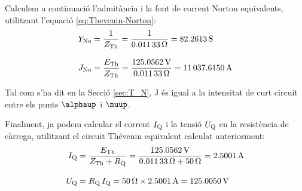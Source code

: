 \begin{exemple}
Calculem a continuaci\'{o} l'admit\`{a}ncia i la font de corrent  Norton equivalents, utilitzant
l'equaci\'{o} \eqref{eq:Thevenin-Norton}:
\begin{align*}
    Y_\mathrm{No} &= \frac{1}{Z_\mathrm{Th}} = \frac{1}{\SI{0,01133}{\ensuremath{\mathrm{\Omega}}}} = \SI{82,2613}{S}
    \\[2ex]
    J_\mathrm{No} &= \frac{E_\mathrm{Th}}{Z_\mathrm{Th}} =
    \frac{\SI{125,0562}{V}}{\SI{0,01133}{\ensuremath{\mathrm{\Omega}}}}= \SI{11037,6150}{A}
\end{align*}

Tal com s'ha dit en la Secci\'{o} \ref{sec:T_N}, J \'{e}s igual a la
intensitat de curt circuit entre els punts $\alphaup$ i $\nuup$.

Finalment, ja podem calcular el corrent $I_\mathrm{Q}$ i la tensi\'{o} $U_\mathrm{Q}$ en la
resist\`{e}ncia de c\`{a}rrega, utilitzant el circuit Th\'{e}venin equivalent calculat anteriorment:
\begin{align*}
    I_\mathrm{Q} &= \frac{E_\mathrm{Th}}{Z_\mathrm{Th} + R_\mathrm{Q}} = \frac{\SI{125,0562}{V}}
    {\SI{0,01133}{\ensuremath{\mathrm{\Omega}}} + \SI{50}{\ensuremath{\mathrm{\Omega}}}} = \SI{2,5001}{A} \\[2ex]
    U_\mathrm{Q} &=  R_\mathrm{Q} \,I_\mathrm{Q} = \SI{50}{\ensuremath{\mathrm{\Omega}}} \times \SI{2,5001}{A} =
    \SI{125,0050}{V}
\end{align*}

\end{exemple}

